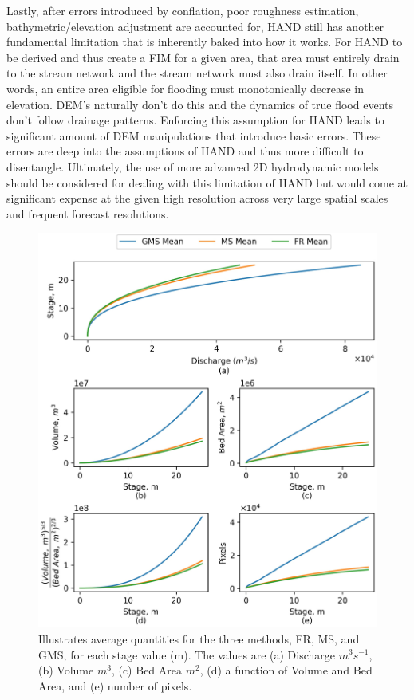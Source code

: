 \documentclass[draft]{dependencies/agujournal2019}
\begin{document}
Lastly, after errors introduced by conflation, poor roughness estimation, bathymetric/elevation adjustment are accounted for, HAND still has another fundamental limitation that is inherently baked into how it works.
For HAND to be derived and thus create a FIM for a given area, that area must entirely drain to the stream network and the stream network must also drain itself.
In other words, an entire area eligible for flooding must monotonically decrease in elevation. 
DEM's naturally don't do this and the dynamics of true flood events don't follow drainage patterns.
Enforcing this assumption for HAND leads to significant amount of DEM manipulations that introduce basic errors.
These errors are deep into the assumptions of HAND and thus more difficult to disentangle.
Ultimately, the use of more advanced 2D hydrodynamic models should be considered for dealing with this limitation of HAND but would come at significant expense at the given high resolution across very large spatial scales and frequent forecast resolutions.
%
\begin{figure}[H]
\centering
\includegraphics[scale=1.0]{figures/rating_curve_comparison.jpg}
\caption{Illustrates average quantities for the three methods, FR, MS, and GMS, for each stage value (m). 
The values are (a) Discharge $m^3s^{-1}$, (b) Volume $m^3$, (c) Bed Area $m^2$, (d) a function of Volume and Bed Area, and (e) number of pixels.
}
\label{fig:rating_curve_comparison}
\end{figure}
\end{document}
